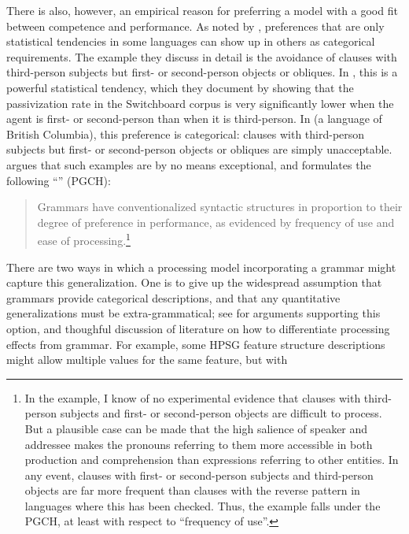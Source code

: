 \documentclass[output=paper
 	        ,biblatex
                ,babelshorthands
                ,newtxmath
                ,draftmode
                ,colorlinks, citecolor=brown
]{langscibook}
\begin{document}
\largerpage[-1] There is also, however, an empirical reason for preferring a model with a good fit
between competence and performance.  As noted by \citet{BresnanEtAl2001}, preferences that are only
statistical tendencies in some languages can show up in others as categorical requirements.  The
example they discuss in detail is the avoidance of clauses with third-person subjects but first- or
second-person objects or obliques. In , this is a powerful statistical tendency, which
they document by showing that the passivization rate in the Switchboard corpus is very significantly
lower when the agent is first- or second-person than when it is third-person.  In  (a
 language of British Columbia), this preference is categorical: clauses with
third-person subjects but first- or second-person objects or obliques are simply unacceptable.
\citet{Hawkins2004a-u,Hawkins2014} argues that such examples are by no means exceptional, and
formulates the following ``'' (PGCH):
\newpage
\begin{quote}
Grammars  have  conventionalized  syntactic  structures  in  proportion   to their degree of
preference in performance, as evidenced by frequency of use and ease of processing.\footnote{In the
  \citeauthor{BresnanEtAl2001} example, I know of no experimental evidence that clauses with
  third-person subjects and first- or second-person objects are difficult to process.  But a
  plausible case can be made that the high salience of speaker and addressee makes the pronouns
  referring to them more accessible in both production and comprehension than expressions referring
  to other entities.  In any event, clauses with first- or second-person subjects and third-person
  objects are far more frequent than clauses with the reverse pattern in languages where this has
  been checked.  Thus, the \citeauthor{BresnanEtAl2001} example falls under the PGCH, at least with
  respect to ``frequency of use''.}
\end{quote}
\largerpage[-1]
There are two ways in which a processing model incorporating a grammar might capture this
generalization.  One is to give up the widespread assumption that grammars provide categorical
descriptions, and that any quantitative generalizations must be extra-grammatical; see
\citet{FrancisPrep-b} for arguments supporting this option, and thoughful discussion of literature
on how to differentiate processing effects from grammar.  For example, some HPSG feature
structure descriptions might allow multiple values for the same feature, but with
\end{document}
